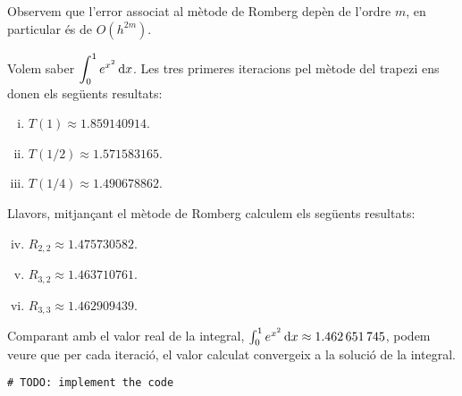 Observem que l'error associat al mètode de Romberg depèn de l'ordre $m$, en particular és de $O(h^{2m})$.

\begin{example}
    Volem saber $\displaystyle \int_{0}^{1} e^{x^{2}} \mathop{}\!\mathrm{d} x$. Les tres primeres iteracions pel mètode del trapezi ens donen els següents resultats:
    \begin{enumerate}[i)]
        \item $T(1) \approx \num{1.859140914}$.
        \item $T(1/2) \approx \num{1.571583165}$.
        \item $T(1/4) \approx \num{1.490678862}$.
    \end{enumerate}
    Llavors, mitjançant el mètode de Romberg calculem els següents resultats:
    \begin{enumerate}[i)]
        \setcounter{enumi}{3}
        \item $R_{2,2} \approx \num{1.475730582}$.
        \item $R_{3,2} \approx \num{1.463710761}$.
        \item $R_{3,3} \approx \num{1.462909439}$.
    \end{enumerate}
    Comparant amb el valor real de la integral, $\int_{0}^{1} e^{x^{2}} \mathop{}\!\mathrm{d} x \approx \num{1.462651745}$, podem veure que per cada iteració, el valor calculat convergeix a la solució de la integral.
\begin{Verbatim}
# TODO: implement the code
\end{Verbatim}
\end{example}

